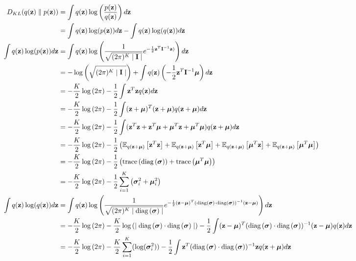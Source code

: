 \documentclass[a4paper]{article}
\begin{document}
\begin{align*}
    \label{eq:}
    D_{KL}(q(\vz) \parallel p(\vz)) & = \int q(\vz)
    \log\left(\frac{p(\vz)}{q(\vz)}\right) d\vz
    \\
    & = \int q(\vz) \log(p(\vz)) d\vz - \int q(\vz) \log(q(\vz)) d\vz 
    \\
    \int q(\vz) \log(p(\vz)) d\vz & = \int 
    q(\vz)
    \log\left(
    \frac{1}{\sqrt{(2\pi)^K \mid \mI \mid }}
    e^{-\frac{1}{2} \vz^T \mI^{-1} \vz)}
    \right) d\vz
    \\
    & = -\log\left(\sqrt{(2\pi)^K \mid \mI \mid } \right) + \int q(\vz)
    \left(-\frac{1}{2} \vz^T \mI^{-1} \vmu \right) d\vz 
    \\
    & = -\frac{K}{2} \log\left( 2\pi \right) - \frac{1}{2} \int
    \vz^T \vz q(\vz) d\vz
    \\
    & = -\frac{K}{2} \log\left( 2\pi \right) - \frac{1}{2} \int
    (\vz + \vmu)^T (\vz + \vmu) q(\vz + \vmu) d\vz
    \\
    & = -\frac{K}{2} \log\left( 2\pi \right) - \frac{1}{2} \int
    (\vz^T \vz + \vz^T \vmu + \vmu^T \vz + \vmu^T \vmu)
    q(\vz + \vmu) d\vz
    \\
    & = -\frac{K}{2} \log\left( 2\pi \right) - \frac{1}{2} \left(
    \EE{q(\vz + \vmu)}{\vz^T \vz} + \EE{q(\vz + \vmu)}{\vz^T \vmu} +
    \EE{q(\vz + \vmu)}{\vmu^T \vz} + \EE{q(\vz + \vmu)}{\vmu^T \vmu} \right)
    \\
    & = -\frac{K}{2} \log\left( 2\pi \right) - \frac{1}{2} \left(
    \trace{\diag{\vsigma} } + \trace{\vmu^T \vmu} \right)
    \\
    & = -\frac{K}{2} \log\left( 2\pi \right) - \frac{1}{2}
    \sumt{i=1}{K} \left( \vsigma_i^2 + \vmu_i^2 \right)
    \\
    \int q(\vz) \log(q(\vz)) d\vz & = \int 
    q(\vz)
    \log\left(
    \frac{1}{\sqrt{(2\pi)^K \mid \diag{\vsigma} \mid }}
    e^{-\frac{1}{2} (\vz - \vmu)^T (\diag{\vsigma} \cdot \diag{\vsigma})^{-1} (\vz - \vmu)}
    \right) d\vz
    \\ 
    & = -\frac{K}{2} \log\left( 2\pi \right) -
    \frac{K}{2} \log\left( \mid \diag{\vsigma} \cdot \diag{\vsigma} \mid \right) - \frac{1}{2} \int
    (\vz - \vmu)^T (\diag{\vsigma} \cdot \diag{\vsigma})^{-1} (\vz
    - \vmu) q(\vz) d\vz
    \\
    & = -\frac{K}{2} \log\left( 2\pi \right) -
    \frac{K}{2} \sumt{i=1}{K}(\log(\vsigma_i^2)) - \frac{1}{2} \int
    \vz^T (\diag{\vsigma} \cdot \diag{\vsigma})^{-1} \vz q(\vz + \vmu) d\vz
    \\

\end{align*}
\end{document}
